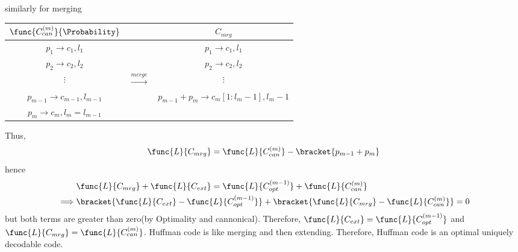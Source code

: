 similarly for merging 
\begin{table}
    \centering 
    \begin{tabular}{c|c|c}
        \(\func{C^{(m)}_{can}}{\Probability}\) & & \(C_{mrg}\) \\\hline 
        \(p_1 \to c_1 , l_1\) & & \(p_1 \to c_1, l_1\)\\ \hline
         \(p_2 \to c_2 , l_2\) & & \(p_2 \to c_2, l_2\)\\ \hline
         \(\vdots\) & \(\xrightarrow{merge}\) & \(\vdots\) \\ \hline
         \(p_{m - 1} \to c_{m-1} , l_{m-1}\) & & \(p_{m-1} + p_{m} \to c_m[1:l_m - 1], l_{m} - 1\)\\ 
         \(p_{m} \to c_{m} , l_{m} = l_{m-1}\)& & \\ 
    \end{tabular}
\end{table}
Thus, 
\begin{equation*}
    \func{L}{C_{mrg}} = \func{L}{C^{(m)}_{can}} - \bracket{p_{m-1} + p_m}
\end{equation*}
hence 
\begin{align*}
    &\func{L}{C_{mrg}}+  \func{L}{C_{ext}} = \func{L}{C^{(m-1)}_{opt}}+ \func{L}{C^{(m)}_{can}} \\ 
    \implies & \bracket{\func{L}{C_{ext}} - \func{L}{C^{(m-1)}_{opt}}} + \bracket{\func{L}{C_{mrg}} - \func{L}{C^{(m)}_{can}}} = 0
\end{align*}
but both terms are greater than zero(by Optimality and cannonical). Therefore, \(\func{L}{C_{ext}} = \func{L}{C^{(m-1)}_{opt}}\) and \(\func{L}{C_{mrg}} = \func{L}{C^{(m)}_{can}}\).
Huffman code is like merging and then extending. Therefore, Huffman code is an optimal uniquely decodable code. 